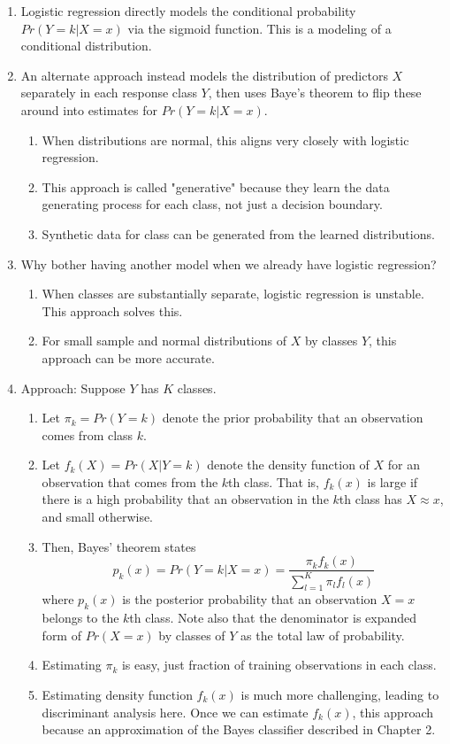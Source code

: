 \documentclass{article}
\begin{document}
\begin{enumerate}
\item Logistic regression directly models the conditional probability $Pr(Y=k | X=x)$ via the sigmoid function. This is a modeling of a conditional distribution.

\item An alternate approach instead models the distribution of predictors $X$ separately in each response class $Y$, then uses Baye's theorem to flip these around into estimates for $Pr(Y=k | X=x)$. 
\begin{enumerate}
\item When distributions are normal, this aligns very closely with logistic regression. 
\item This approach is called "generative" because they learn the data generating process for each class, not just a decision boundary.
\item Synthetic data for class can be generated from the learned distributions.
\end{enumerate}

\item Why bother having another model when we already have logistic regression?
\begin{enumerate}
\item When classes are substantially separate, logistic regression is unstable. This approach solves this.
\item For small sample and normal distributions of $X$ by classes $Y$, this approach can be more accurate.
\end{enumerate}

\item Approach: Suppose $Y$ has $K$ classes.
\begin{enumerate}
\item Let $\pi_k = Pr(Y=k)$ denote the prior probability that an observation comes from class $k$.
\item Let $f_k(X) = Pr(X | Y=k)$ denote the density function of $X$ for an observation that comes from the $k$th class. That is, $f_k(x)$ is large if there is a high probability that an observation in the $k$th class has $X \approx x$, and small otherwise.
\item Then, Bayes' theorem states
\[
p_k(x) = Pr(Y=k | X=x) = \frac{\pi_k f_k(x)}{\sum_{l=1}^K \pi_l f_l(x)}
\]
where $p_k(x)$ is the posterior probability that an observation $X=x$ belongs to the $k$th class. Note also that the denominator is expanded form of $Pr(X=x)$ by classes of $Y$ as the total law of probability.
\item Estimating $\pi_k$ is easy, just fraction of training observations in each class.
\item Estimating density function $f_k(x)$ is much more challenging, leading to discriminant analysis here. Once we can estimate $f_k(x)$, this approach because an approximation of the Bayes classifier described in Chapter 2.
\end{enumerate}


\end{enumerate}
\end{document}
